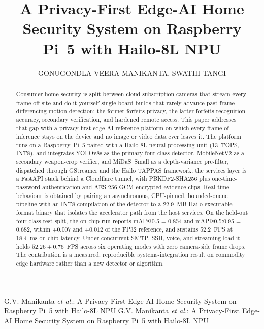 \documentclass{ieeeaccess}
\begin{document}
\history{}
\doi{}

\title{A Privacy-First Edge-AI Home Security System on Raspberry Pi~5 with Hailo-8L NPU}
\author{\uppercase{Gonugondla Veera Manikanta}, \uppercase{Swathi Tangi}}

\address[1]{Manipal Institute of Technology, Manipal Academy of Higher Education, Manipal, India}

\markboth
{G.V. Manikanta \emph{et al.}: A Privacy-First Edge-AI Home Security System on Raspberry Pi~5 with Hailo-8L NPU}
{G.V. Manikanta \emph{et al.}: A Privacy-First Edge-AI Home Security System on Raspberry Pi~5 with Hailo-8L NPU}



\begin{abstract}
Consumer home security is split between cloud-subscription cameras that stream every frame off-site and do-it-yourself single-board builds that rarely advance past frame-differencing motion detection; the former forfeits privacy, the latter forfeits recognition accuracy, secondary verification, and hardened remote access. This paper addresses that gap with a privacy-first edge-AI reference platform on which every frame of inference stays on the device and no image or video data ever leaves it. The platform runs on a Raspberry~Pi~5 paired with a Hailo-8L neural processing unit (13~TOPS, INT8), and integrates YOLOv8s as the primary four-class detector, MobileNetV2 as a secondary weapon-crop verifier, and MiDaS~Small as a depth-variance pre-filter, dispatched through GStreamer and the Hailo TAPPAS framework; the services layer is a FastAPI stack behind a Cloudflare tunnel, with PBKDF2-SHA256 plus one-time-password authentication and AES-256-GCM encrypted evidence clips. Real-time behaviour is obtained by pairing an asynchronous, CPU-pinned, bounded-queue pipeline with an INT8 compilation of the detector to a 22.9~MB Hailo executable format binary that isolates the accelerator path from the host services. On the held-out four-class test split, the on-chip run reports mAP{@}0.5 = 0.854 and mAP{@}0.5:0.95 = 0.682, within $+0.007$ and $+0.012$ of the FP32 reference, and sustains 52.2~FPS at 18.4~ms on-chip latency. Under concurrent SMTP, SSH, voice, and streaming load it holds $52.26 \pm 0.76$~FPS across six operating modes with zero camera-side frame drops. The contribution is a measured, reproducible systems-integration result on commodity edge hardware rather than a new detector or algorithm.
\end{abstract}
\end{document}
